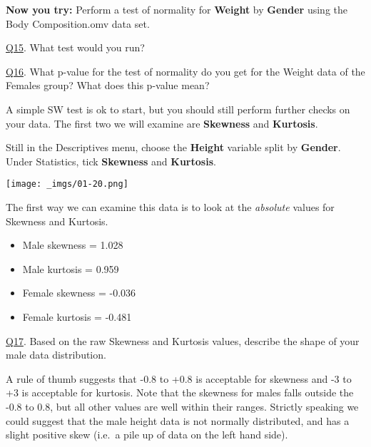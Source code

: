 \documentclass[
  letterpaper,
  DIV=11,
  numbers=noendperiod]{scrartcl}
\providecommand{\tightlist}{%
  \setlength{\itemsep}{0pt}\setlength{\parskip}{0pt}}\usepackage{longtable,booktabs,array}
\begin{document}
\textbf{Now you try:} Perform a test of normality for \textbf{Weight} by
\textbf{Gender} using the Body Composition.omv data set.

\begin{tcolorbox}[beforeafter skip=1cm, ignore nobreak=true, breakable, colframe=Questions-frame, colback=Questions-bg, coltext=Questions-text, boxsep=2mm, arc=0mm, boxrule=0.5mm]

\protect\hypertarget{Q15}{\protect\hyperlink{A15}{Q15}}. What test would
you run?

\protect\hypertarget{Q16}{\protect\hyperlink{A16}{Q16}}. What p-value
for the test of normality do you get for the Weight data of the Females
group? What does this p-value mean?

\end{tcolorbox}

A simple SW test is ok to start, but you should still perform further
checks on your data. The first two we will examine are \textbf{Skewness}
and \textbf{Kurtosis}.

Still in the Descriptives menu, choose the \textbf{Height} variable
split by \textbf{Gender}. Under Statistics, tick \textbf{Skewness} and
\textbf{Kurtosis}.

\texttt{[image: \_imgs/01-20.png]}

The first way we can examine this data is to look at the \emph{absolute}
values for Skewness and Kurtosis.

\begin{itemize}
\tightlist
\item
  Male skewness = 1.028
\item
  Male kurtosis = 0.959
\item
  Female skewness = -0.036
\item
  Female kurtosis = -0.481
\end{itemize}

\begin{tcolorbox}[beforeafter skip=1cm, ignore nobreak=true, breakable, colframe=Questions-frame, colback=Questions-bg, coltext=Questions-text, boxsep=2mm, arc=0mm, boxrule=0.5mm]

\protect\hypertarget{Q17}{\protect\hyperlink{A17}{Q17}}. Based on the
raw Skewness and Kurtosis values, describe the shape of your male data
distribution.

\end{tcolorbox}

A rule of thumb suggests that -0.8 to +0.8 is acceptable for skewness
and -3 to +3 is acceptable for kurtosis. Note that the skewness for
males falls outside the -0.8 to 0.8, but all other values are well
within their ranges. Strictly speaking we could suggest that the male
height data is not normally distributed, and has a slight positive skew
(i.e.~a pile up of data on the left hand side).
\end{document}
